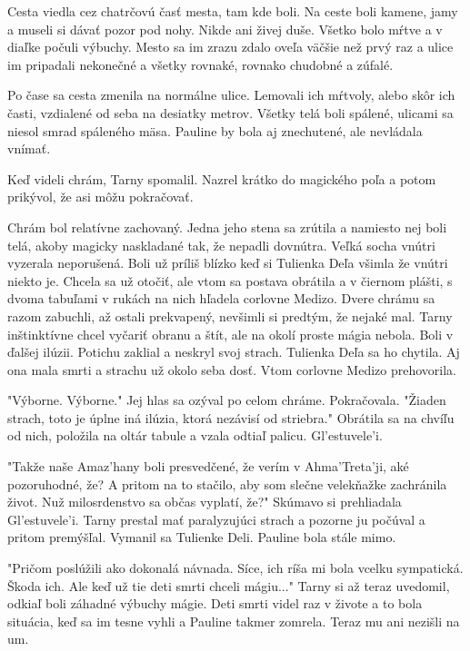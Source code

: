 \documentclass{book}
\begin{document}
Cesta viedla cez chatrčovú časť mesta, tam kde boli. Na ceste boli kamene, jamy a museli si dávať pozor pod nohy. Nikde ani živej duše. Všetko bolo mŕtve a v diaľke počuli výbuchy. Mesto sa im zrazu zdalo oveľa väčšie než prvý raz a ulice im pripadali nekonečné a všetky rovnaké, rovnako chudobné a zúfalé.

Po čase sa cesta zmenila na normálne ulice. Lemovali ich mŕtvoly, alebo skôr ich časti, vzdialené od seba na desiatky metrov. Všetky telá boli spálené, ulicami sa niesol smrad spáleného mäsa. Pauline by bola aj znechutené, ale nevládala vnímať.

Keď videli chrám, Tarny spomalil. Nazrel krátko do magického poľa a potom prikývol, že asi môžu pokračovať.

Chrám bol relatívne zachovaný. Jedna jeho stena sa zrútila a namiesto nej boli telá, akoby magicky naskladané tak, že nepadli dovnútra. Veľká socha vnútri vyzerala neporušená. Boli už príliš blízko keď si Tulienka Deľa všimla že vnútri niekto je. Chcela sa už otočiť, ale vtom sa postava obrátila a v čiernom plášti, s dvoma tabuľami v rukách na nich hľadela corlovne Medizo. Dvere chrámu sa razom zabuchli, až ostali prekvapený, nevšimli si predtým, že nejaké mal. Tarny inštinktívne chcel vyčariť obranu a štít, ale na okolí proste mágia nebola. Boli v ďalšej ilúzii. Potichu zaklial a neskryl svoj strach. Tulienka Deľa sa ho chytila. Aj ona mala smrti a strachu už okolo seba dosť. Vtom corlovne Medizo prehovorila.

"$ $Výborne. Výborne."$ $ Jej hlas sa ozýval po celom chráme. Pokračovala. "$ $Žiaden strach, toto je úplne iná ilúzia, ktorá nezávisí od striebra."$ $ Obrátila sa na chvíľu od nich, položila na oltár tabule a vzala odtiaľ palicu. Gl'estuvele'i.

"$ $Takže naše Amaz'hany boli presvedčené, že verím v Ahma'Treta'ji, aké pozoruhodné, že? A pritom na to stačilo, aby som slečne velekňažke zachránila život. Nuž milosrdenstvo sa občas vyplatí, že?"$ $ Skúmavo si prehliadala Gl'estuvele'i. Tarny prestal mať paralyzujúci strach a pozorne ju počúval a pritom premýšľal. Vymanil sa Tulienke Deli. Pauline bola stále mimo.

"$ $Pričom poslúžili ako dokonalá návnada. Síce, ich ríša mi bola vcelku sympatická. Škoda ich. Ale keď už tie deti smrti chceli mágiu..."$ $ Tarny si až teraz uvedomil, odkiaľ boli záhadné výbuchy mágie. Deti smrti videl raz v živote a to bola situácia, keď sa im tesne vyhli a Pauline takmer zomrela. Teraz mu ani nezišli na um.
\end{document}
